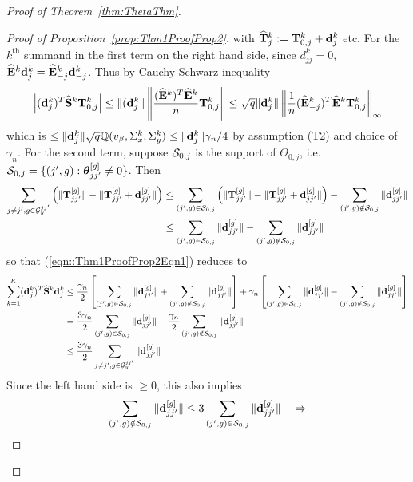 \documentclass[12pt, letterpaper]{article}
\numberwithin{equation}{section}
\begin{document}
\begin{proof}[Proof of Theorem~\ref{thm:ThetaThm}]
\begin{proof}[Proof of Proposition~\ref{prop:Thm1ProofProp2}]
%
with $\widehat {{\mathbf{T}}}_j^k := {\mathbf{T}}_{0,j}^k + {\bf{d}}_{j}^k$ etc. For the $k^\text{th}$ summand in the first term on the right hand side, since $d_{jj}^k = 0$, $\widehat {{\mathbf{E}}}^k {\bf{d}}_j^k = \widehat {{\mathbf{E}}}_{-j}^k {\bf{d}}_{-j}^k$. Thus by Cauchy-Schwarz inequality
%
$$
\left| ({\bf{d}}_j^k)^T \widehat {{\mathbf{S}}}^k {\mathbf{T}}_{0,j}^k \right| \leq
\| ({\bf{d}}_j^k \| \left\| \frac{ (\widehat {{\mathbf{E}}}^k)^T \widehat {{\mathbf{E}}}^k }{n} {\mathbf{T}}_{0,j}^k \right\| \leq
\sqrt{q} \| {\bf{d}}_j^k \| \left\| \frac{1}{n} (\widehat {{\mathbf{E}}}_{-j}^k)^T \widehat {{\mathbf{E}}}^k {\mathbf{T}}_{0,j}^k \right\|_\infty
$$
%
which is $\leq \| {\bf{d}}_j^k\| \sqrt q {\mathbb{Q}}(v_\beta, \Sigma_x^k, \Sigma_y^k) \leq \| {\bf{d}}_j^k\| \gamma_n/4 $ by assumption (T2) and choice of $\gamma_n$. For the second term, 
suppose ${\cal{S}}_{0,j}$ is the support of $\Theta_{0,j}$, i.e. ${\cal{S}}_{0,j} = \{ (j',g): {\boldsymbol{\theta}}_{jj'}^{[g]} \neq 0 \}$. Then
%
\begin{align*}
\sum_{j \neq j', g \in {\cal{G}}_y^{jj'}} \left( \| {\mathbf{T}}_{jj'}^{[g]} \| -  \| {\mathbf{T}}_{jj'}^{[g]} + {\bf{d}}_{jj'}^{[g]}\| \right) & \leq
\sum_{(j',g) \in {\cal{S}}_{0,j}} \left( \| {\mathbf{T}}_{jj'}^{[g]} \| -  \| {\mathbf{T}}_{jj'}^{[g]} + {\bf{d}}_{jj'}^{[g]}\| \right) -
\sum_{(j',g) \notin {\cal{S}}_{0,j}} \| {\bf{d}}_{jj'}^{[g]} \|\\
& \leq \sum_{(j',g) \in {\cal{S}}_{0,j}} \| {\bf{d}}_{jj'}^{[g]} \| - \sum_{(j',g) \notin {\cal{S}}_{0,j}} \| {\bf{d}}_{jj'}^{[g]} \|
\end{align*}
so that (\ref{eqn::Thm1ProofProp2Eqn1}) reduces to
%
\begin{align}\label{eqn:Thm1ProofProp2Eqn3}
\sum_{k=1}^K ({\bf{d}}_j^k)^T \widehat {{\mathbf{S}}}^k {\bf{d}}_j^k & \leq 
\frac{\gamma_n}{2} \left[ \sum_{(j',g) \in {\cal{S}}_{0,j}} \| {\bf{d}}_{jj'}^{[g]} \| + \sum_{(j',g) \notin {\cal{S}}_{0,j}} \| {\bf{d}}_{jj'}^{[g]} \| \right] +
\gamma_n \left[ \sum_{(j',g) \in {\cal{S}}_{0,j}} \| {\bf{d}}_{jj'}^{[g]} \| - \sum_{(j',g) \notin {\cal{S}}_{0,j}} \| {\bf{d}}_{jj'}^{[g]} \| \right] \notag\\
& = \frac{3 \gamma_n}{2} \sum_{(j',g) \in {\cal{S}}_{0,j}} \| {\bf{d}}_{jj'}^{[g]} \| - \frac{\gamma_n}{2} \sum_{(j',g) \notin {\cal{S}}_{0,j}} \| {\bf{d}}_{jj'}^{[g]} \| \notag\\
& \leq \frac{3 \gamma_n}{2} \sum_{j \neq j', g \in {\cal{G}}_y^{jj'}} \| {\bf{d}}_{jj'}^{[g]} \|
\end{align}
%
Since the left hand side is $\geq 0$, this also implies
%
$$
\sum_{(j',g) \notin {\cal{S}}_{0,j}} \| {\bf{d}}_{jj'}^{[g]} \| \leq 3 \sum_{(j',g) \in {\cal{S}}_{0,j}} \| {\bf{d}}_{jj'}^{[g]} \| \quad \Rightarrow
$$
\end{proof}
\end{proof}
\end{document}
